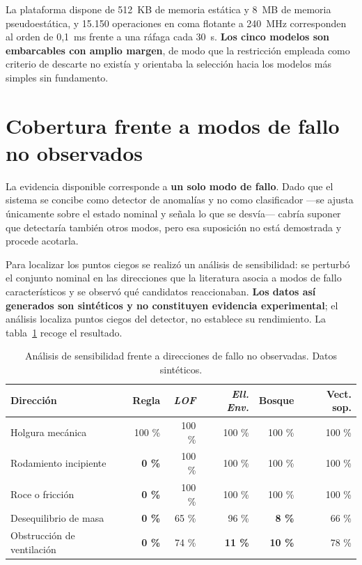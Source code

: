 La plataforma dispone de \mbox{512 KB} de memoria estática y \mbox{8 MB} de memoria
pseudoestática, y \mbox{15.150} operaciones en coma flotante a \mbox{240 MHz} corresponden al
orden de \mbox{0,1 ms} frente a una ráfaga cada \mbox{30 s}. \textbf{Los cinco modelos son
embarcables con amplio margen}, de modo que la restricción empleada como criterio de descarte no
existía y orientaba la selección hacia los modelos más simples sin fundamento.
\section{Cobertura frente a modos de fallo no observados}

La evidencia disponible corresponde a \textbf{un solo modo de fallo}. Dado que el sistema se
concibe como detector de anomalías y no como clasificador —se ajusta únicamente sobre el estado
nominal y señala lo que se desvía— cabría suponer que detectaría también otros modos, pero esa
suposición no está demostrada y procede acotarla.

Para localizar los puntos ciegos se realizó un análisis de sensibilidad: se perturbó el conjunto
nominal en las direcciones que la literatura asocia a modos de fallo característicos y se
observó qué candidatos reaccionaban. \textbf{Los datos así generados son sintéticos y no
constituyen evidencia experimental}; el análisis localiza puntos ciegos del detector, no
establece su rendimiento. La tabla~\ref{table:cobertura-modos} recoge el resultado.

\begin{table}[ht!]
\caption{Análisis de sensibilidad frente a direcciones de fallo no observadas. Datos sintéticos.}
\label{table:cobertura-modos}
\centering
\begin{tabular}{|p{3.6cm}|r|r|r|r|r|}
\hline
\textbf{Dirección} & \textbf{Regla} & \textbf{\textit{LOF}} & \textbf{\textit{Ell. Env.}} & \textbf{Bosque} & \textbf{Vect. sop.} \\
\hline
Holgura mecánica & 100 \% & 100 \% & 100 \% & 100 \% & 100 \% \\
\hline
Rodamiento incipiente & \textbf{0 \%} & 100 \% & 100 \% & 100 \% & 100 \% \\
\hline
Roce o fricción & \textbf{0 \%} & 100 \% & 100 \% & 100 \% & 100 \% \\
\hline
Desequilibrio de masa & \textbf{0 \%} & 65 \% & 96 \% & \textbf{8 \%} & 66 \% \\
\hline
Obstrucción de ventilación & \textbf{0 \%} & 74 \% & \textbf{11 \%} & \textbf{10 \%} & 78 \% \\
\hline
\end{tabular}
\end{table}


